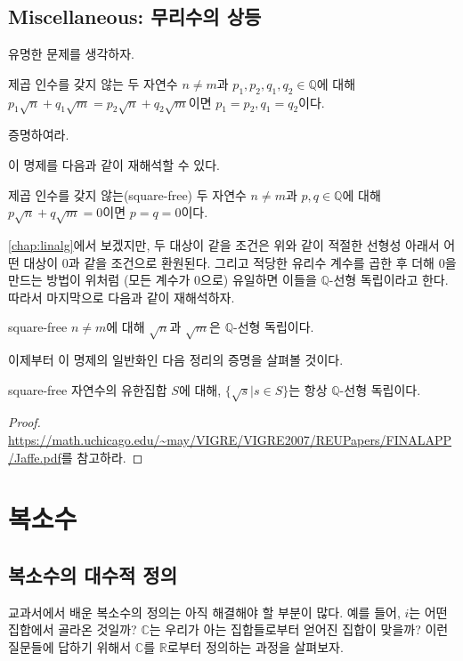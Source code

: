 \section{Miscellaneous: 무리수의 상등}
유명한 문제를 생각하자. 
\begin{example}
    제곱 인수를 갖지 않는 두 자연수 $n\neq m$과 $p_1, p_2, q_1, q_2\in \mathbb{Q}$에 대해 $p_1\sqrt n + q_1\sqrt m = p_2\sqrt n + q_2 \sqrt m$이면 $p_1=p_2, q_1=q_2$이다. 
\end{example}
\begin{exercise}
    증명하여라. 
\end{exercise}
이 명제를 다음과 같이 재해석할 수 있다. 
\begin{example}
    제곱 인수를 갖지 않는(square-free) 두 자연수 $n\neq m$과 $p, q\in \mathbb{Q}$에 대해 $p\sqrt n + q\sqrt m = 0$이면 $p=q=0$이다. 
\end{example}
\cref{chap:linalg}에서 보겠지만, 두 대상이 같을 조건은 위와 같이 적절한 선형성 아래서 어떤 대상이 0과 같을 조건으로 환원된다. 그리고 적당한 유리수 계수를 곱한 후 더해 0을 만드는 방법이 위처럼 (모든 계수가 0으로) 유일하면 이들을 $\mathbb{Q}$-선형 독립이라고 한다. 따라서 마지막으로 다음과 같이 재해석하자. 
\begin{example}
    square-free $n\neq m$에 대해 $\sqrt{n}$과 $\sqrt{m}$은 $\mathbb{Q}$-선형 독립이다. 
\end{example}
이제부터 이 명제의 일반화인 다음 정리의 증명을 살펴볼 것이다. 
\begin{theorem}
    square-free 자연수의 유한집합 $S$에 대해, $\{\sqrt{s}|s\in S\}$는 항상 $\mathbb{Q}$-선형 독립이다. 
\end{theorem}
\begin{proof}
    \url{https://math.uchicago.edu/~may/VIGRE/VIGRE2007/REUPapers/FINALAPP/Jaffe.pdf}를 참고하라. 
\end{proof}
\chapter{복소수}
\section{복소수의 대수적 정의}
교과서에서 배운 복소수의 정의는 아직 해결해야 할 부분이 많다. 예를 들어, $i$는 어떤 집합에서 골라온 것일까? $\mathbb{C}$는 우리가 아는 집합들로부터 얻어진 집합이 맞을까? 이런 질문들에 답하기 위해서 $\mathbb{C}$를 $\mathbb{R}$로부터 정의하는 과정을 살펴보자. 
